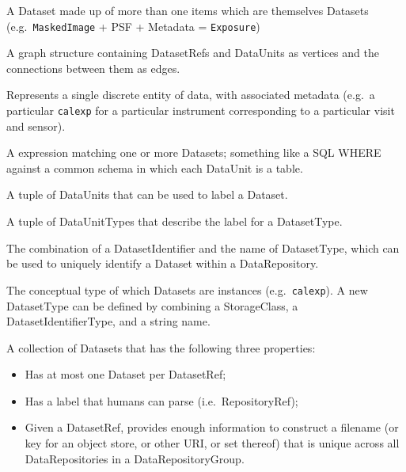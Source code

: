 \documentclass[DM,toc,lsstdraft]{lsstdoc}
\begin{document}
\begin{description}[style=nextline]

\item[Composite Dataset] A Dataset made up of more than one items which are themselves Datasets (e.g.\ \texttt{MaskedImage} + PSF + Metadata = \texttt{Exposure})

\item[DataGraph] A graph structure containing DatasetRefs and DataUnits as vertices and the connections between them as edges.

\item[Dataset] Represents a single discrete entity of data, with associated metadata (e.g.\ a particular \texttt{calexp} for a particular instrument corresponding to a particular visit and sensor).

\item[DatasetExpression] A expression matching one or more Datasets; something like a SQL WHERE against a common schema in which each DataUnit is a table.

\item[DatasetIdentifier (or DataID)] A tuple of DataUnits that can be used to label a Dataset.

\item[DatasetIdentifierType] A tuple of DataUnitTypes that describe the label for a DatasetType.

\item[DatasetRef] The combination of a DatasetIdentifier and the name of DatasetType, which can be used to uniquely identify a Dataset within a DataRepository.

\item[DatasetType] The conceptual type of which Datasets are instances (e.g.\ \texttt{calexp}).  A new DatasetType can be defined by combining a StorageClass, a DatasetIdentifierType, and a string name.

\item[DataRepository] A collection of Datasets that has the following three properties:
\begin{itemize}
\item Has at most one Dataset per DatasetRef;
\item Has a label that humans can parse (i.e.\ RepositoryRef);
\item Given a DatasetRef, provides enough information to construct a filename (or key for an object store, or other URI, or set thereof) that is unique across all DataRepositories in a DataRepositoryGroup.
\end{itemize}


\end{description}
\end{document}
